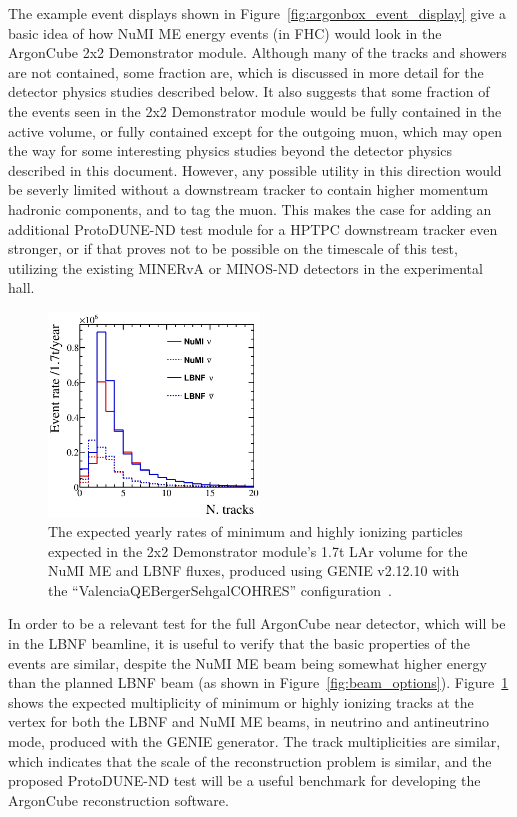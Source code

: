 The example event displays shown in Figure~\ref{fig:argonbox_event_display} give a basic idea of how NuMI ME energy events (in FHC) would look in the ArgonCube 2x2 Demonstrator module. Although many of the tracks and showers are not contained, some fraction are, which is discussed in more detail for the detector physics studies described below. It also suggests that some fraction of the events seen in the 2x2 Demonstrator module would be fully contained in the active volume, or fully contained except for the outgoing muon, which may open the way for some interesting physics studies beyond the detector physics described in this document. However, any possible utility in this direction would be severly limited without a downstream tracker to contain higher momentum hadronic components, and to tag the muon. This makes the case for adding an additional ProtoDUNE-ND test module for a HPTPC downstream tracker even stronger, or if that proves not to be possible on the timescale of this test, utilizing the existing MINERvA or MINOS-ND detectors in the experimental hall.

\begin{figure}[htb]
  \centering
  \includegraphics[width=0.5\textwidth]{plots/2x2_ntracks_all.png}
  \caption{The expected yearly rates of minimum and highly ionizing particles expected in the 2x2 Demonstrator module's 1.7t LAr volume for the NuMI ME and LBNF fluxes, produced using GENIE v2.12.10 with the ``ValenciaQEBergerSehgalCOHRES'' configuration~\cite{genie}.}
  \label{fig:track_multiplicity}
\end{figure}
In order to be a relevant test for the full ArgonCube near detector, which will be in the LBNF beamline, it is useful to verify that the basic properties of the events are similar, despite the NuMI ME beam being somewhat higher energy than the planned LBNF beam (as shown in Figure~\ref{fig:beam_options}). Figure~\ref{fig:track_multiplicity} shows the expected multiplicity of minimum or highly ionizing tracks at the vertex for both the LBNF and NuMI ME beams, in neutrino and antineutrino mode, produced with the GENIE generator. The track multiplicities are similar, which indicates that the scale of the reconstruction problem is similar, and the proposed ProtoDUNE-ND test will be a useful benchmark for developing the ArgonCube reconstruction software.

